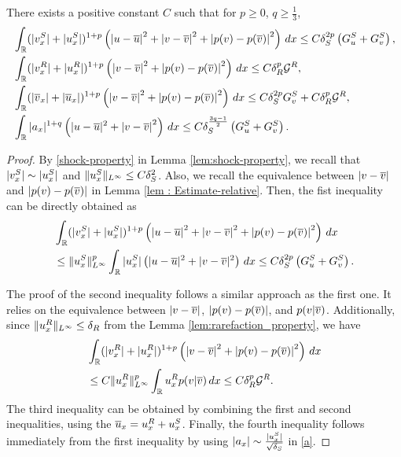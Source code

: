 \documentclass[11pt,reqno]{amsart}
\begin{document}
\begin{lemma} 
\label{lem: Useful bad terms estimates} There exists a positive constant $C$ such that for $p \ge 0$, $q \ge \frac{1}{3}$,
\begin{equation*} %
    \begin{aligned}
    &\int_\mathbb{R} (|\vs_x|+|\us_x|)^{1+p} \left( \left|u-\ou\right|^2 +\left| v-\ov \right|^2 + \left| p(v)-p(\ov) \right|^2 \right) \, dx \le C \delta_S^{2p}  \left(G^S_u +G^S_v\right) , \\ 
    &\int_\mathbb{R} (|\vr_x|+|\ur_x|)^{1+p} \left(  \left| v-\ov \right|^2 +\left| p(v)-p(\ov) \right|^2 \right) \, dx  \le C \delta_R^p    \mathcal{G}^R  , \\
    &\int_\mathbb{R} (|\ov_x|+|\ou_x|)^{1+p} \left(  \left| v-\ov \right|^2 +\left| p(v)-p(\ov) \right|^2 \right) \, dx   \le C \delta_S^{2p} G^S_v +C \delta_R^p  \mathcal{G}^R ,\\
    &\int_\mathbb{R} |a_x|^{1+q} \left(|u-\ou|^2 + \left|v-\ov\right|^2 \right)\, dx \le C \delta_S^{\frac{3q-1}{2}}  \left( G^S_u + G^S_v \right) .
    \end{aligned}
\end{equation*}
\end{lemma}
\begin{proof} By \eqref{shock-property} in Lemma \ref{lem:shock-property}, we recall that $|v^S_x| \sim |u^S_x|$ and $\|u^S_x\|_{L^\infty} \le C \delta_S^2$. Also,  we recall the equivalence between $|v-\overline{v}|$ and $|p(v)-p(\overline{v})|$ in Lemma \ref{lem : Estimate-relative}. Then, the fist inequality can be directly obtained as
    \begin{align*}
        &\int_\mathbb{R} (|v^S_x|+|u^S_x|)^{1+p} \left( \left|u-\overline{u}\right|^2 +\left| v-\overline{v} \right|^2 + \left| p(v)-p(\overline{v}) \right|^2 \right) \, dx \\ 
        &\le \|u^S_x\|_{L^\infty}^p \int_\mathbb{R} |u^S_x| \left( |u-\overline{u}|^2 + |v-\overline{v}|^2 \right) \, dx\le C \delta_S^{2p}  \left(G^S_u +G^S_v\right).
    \end{align*}

The proof of the second inequality follows a similar approach as the first one. It relies on the equivalence between $|v-\overline{v}|$, $|p(v)-p(\overline{v})|$, and $p(v|\overline{v})$. Additionally, since $\| u^R_x\|_{L^\infty} \le \delta_R$ from the Lemma \ref{lem:rarefaction_property}, we have
\begin{align*}
     &\int_\mathbb{R} (|v^R_x|+|u^R_x|)^{1+p} \left(  \left| v-\overline{v} \right|^2 +\left| p(v)-p(\overline{v}) \right|^2 \right) \, dx \\ 
     &\le C \|u^R_x\|_{L^\infty}^p \int_\mathbb{R}  u^R_x p(v|\overline{v}) \, dx \le C \delta_R^p \mathcal{G}^R.
\end{align*}
The third inequality can be obtained by combining the first and second inequalities, using the $\overline{u}_x=u^R_x+u^S_x$. Finally, the fourth inequality follows immediately from the first inequality by using $|a_x| \sim \frac{|u^S_x|}{\sqrt{\delta_S}}$ in \eqref{a}.
\end{proof}
\end{document}
